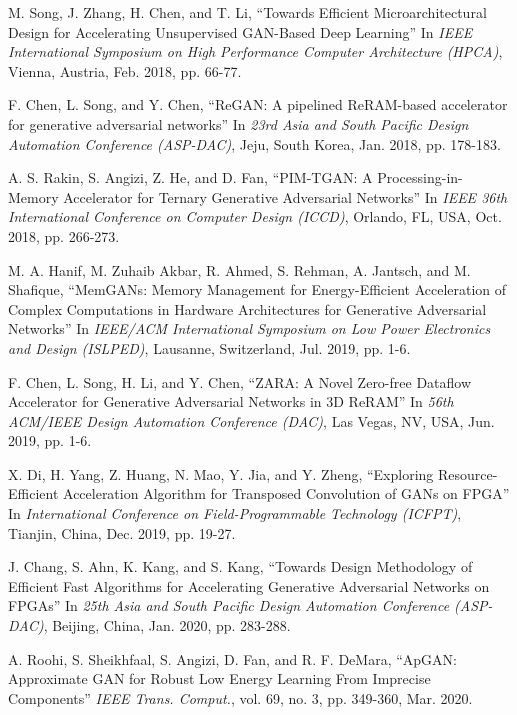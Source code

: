 \documentclass[journal]{IEEEtran}
\begin{document}
\begin{thebibliography}{9}
M. Song, J. Zhang, H. Chen, and T. Li, ``Towards Efficient Microarchitectural Design for Accelerating Unsupervised GAN-Based Deep Learning'' In \textit{IEEE International Symposium on High Performance Computer Architecture (HPCA)}, Vienna, Austria, Feb. 2018, pp. 66-77.

F. Chen, L. Song, and Y. Chen, ``ReGAN: A pipelined ReRAM-based accelerator for generative adversarial networks'' In \textit{23rd Asia and South Pacific Design Automation Conference (ASP-DAC)}, Jeju, South Korea, Jan. 2018, pp. 178-183.

A. S. Rakin, S. Angizi, Z. He, and D. Fan, ``PIM-TGAN: A Processing-in-Memory Accelerator for Ternary Generative Adversarial Networks'' In \textit{IEEE 36th International Conference on Computer Design (ICCD)}, Orlando, FL, USA, Oct. 2018, pp. 266-273.

M. A. Hanif, M. Zuhaib Akbar, R. Ahmed, S. Rehman, A. Jantsch, and M. Shafique, ``MemGANs: Memory Management for Energy-Efficient Acceleration of Complex Computations in Hardware Architectures for Generative Adversarial Networks'' In \textit{IEEE/ACM International Symposium on Low Power Electronics and Design (ISLPED)}, Lausanne, Switzerland, Jul. 2019, pp. 1-6.

F. Chen, L. Song, H. Li, and Y. Chen, ``ZARA: A Novel Zero-free Dataflow Accelerator for Generative Adversarial Networks in 3D ReRAM'' In \textit{56th ACM/IEEE Design Automation Conference (DAC)}, Las Vegas, NV, USA, Jun. 2019, pp. 1-6.

X. Di, H. Yang, Z. Huang, N. Mao, Y. Jia, and Y. Zheng, ``Exploring Resource-Efficient Acceleration Algorithm for Transposed Convolution of GANs on FPGA'' In \textit{International Conference on Field-Programmable Technology (ICFPT)}, Tianjin, China, Dec. 2019, pp. 19-27.

J. Chang, S. Ahn, K. Kang, and S. Kang, ``Towards Design Methodology of Efficient Fast Algorithms for Accelerating Generative Adversarial Networks on FPGAs'' In \textit{25th Asia and South Pacific Design Automation Conference (ASP-DAC)}, Beijing, China, Jan. 2020, pp. 283-288.

A. Roohi, S. Sheikhfaal, S. Angizi, D. Fan, and R. F. DeMara, ``ApGAN: Approximate GAN for Robust Low Energy Learning From Imprecise Components'' \textit{IEEE Trans. Comput.}, vol. 69, no. 3, pp. 349-360, Mar. 2020.

\end{thebibliography}
\end{document}
